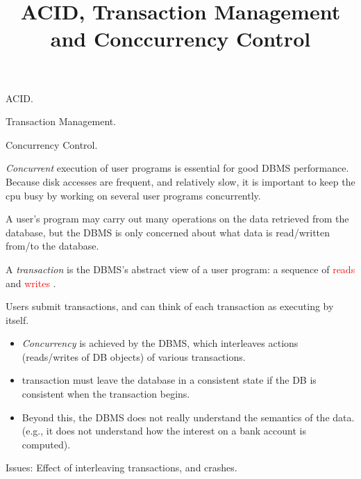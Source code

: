 \documentclass{beamer}
\title{ACID, Transaction Management and Conccurrency Control }
\author{ }
\institute{Hogeschool Rotterdam \\ 
Rotterdam, Netherlands}
\date{}
\newcommand{\red}[1]{
\textcolor{red}{#1}
}
\begin{document}
\maketitle

\begin{slide}{
\item ACID.
\item Transaction Management.
\item Concurrency Control.
}\end{slide}

\begin{slide}{
\item \emph{Concurrent} execution of user programs is essential for good DBMS performance.
Because disk accesses are frequent, and relatively slow, it is important to keep the cpu busy by working on several user programs concurrently.
\item A user’s program may carry out many operations on the data retrieved from the database, but the DBMS is only concerned about what data is read/written from/to the database.
\item A \emph{transaction} is the DBMS’s abstract view of a user program:  a sequence of \red{reads} and \red{writes}.
}\end{slide}


\begin{slide}{
\item Users submit transactions, and can think of each transaction as executing by itself.
\begin{itemize}
	\item \emph{Concurrency} is achieved by the DBMS, which interleaves actions (reads/writes of DB objects) of various transactions.
	\item transaction must leave the database in a consistent state if the DB is consistent when the transaction begins.
	\item Beyond this, the DBMS does not really understand the semantics of the data.  (e.g., it does not understand how the interest on a bank account is computed).	
\end{itemize}
\item Issues:  Effect of interleaving transactions, and crashes.
}\end{slide}
\end{document}
